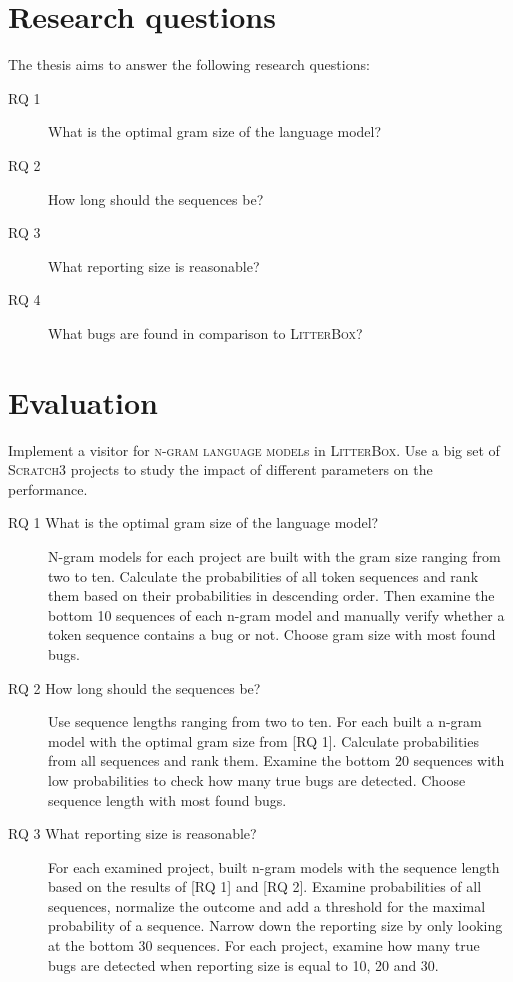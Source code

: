 \documentclass[
    numbers=noenddot,
    parskip=half-,
    fontsize=12pt,
    paper=a4,
    oneside,
    titlepage,
    bibliography=totoc,
    chapterprefix=false,
]{scrbook}
\newcommand{\ngram}{\textsc{n-gram language model}}
\newcommand{\litterbox}{\textsc{LitterBox}}
\newcommand{\scratch}{\textsc{Scratch}}
\begin{document}
    \chapter{Research questions}\label{ch:research-questions}
    The thesis aims to answer the following research questions:

    \begin{description}
        \item[RQ 1] What is the optimal gram size of the language model?
        \item[RQ 2] How long should the sequences be?
        \item[RQ 3] What reporting size is reasonable?
        \item[RQ 4] What bugs are found in comparison to \litterbox{}?
    \end{description}


    \chapter{Evaluation}\label{ch:evaluation}
    
    Implement a visitor for \ngram{s} in \litterbox{}. Use a big set of \scratch{3} projects to study the impact of different parameters on the performance.  
    
    \begin{description}
        \item[RQ 1 What is the optimal gram size of the language model?] N-gram models for each project are built with the gram size ranging from two to ten. Calculate the probabilities of all token sequences and rank them based on their probabilities in descending order. Then examine the bottom 10 sequences of each n-gram model and manually verify whether a token sequence contains a bug or not. Choose gram size with most found bugs.
        \item[RQ 2 How long should the sequences be?]
        Use sequence lengths ranging from two to ten. For each built a n-gram model with the optimal gram size from [RQ 1]. Calculate probabilities from all sequences and rank them. Examine the bottom 20 sequences with low probabilities to check how many true bugs are detected. Choose sequence length with most found bugs.
        \item[RQ 3 What reporting size is reasonable?]
        For each examined project, built n-gram models with the sequence length based on the results of [RQ 1] and [RQ 2]. Examine probabilities of all sequences, normalize the outcome and add a threshold for the maximal probability of a sequence. Narrow down the reporting size by only looking at the bottom 30 sequences. For each project, examine how many true bugs are detected when reporting size is equal to 10, 20 and 30.
    \end{description}
\end{document}
